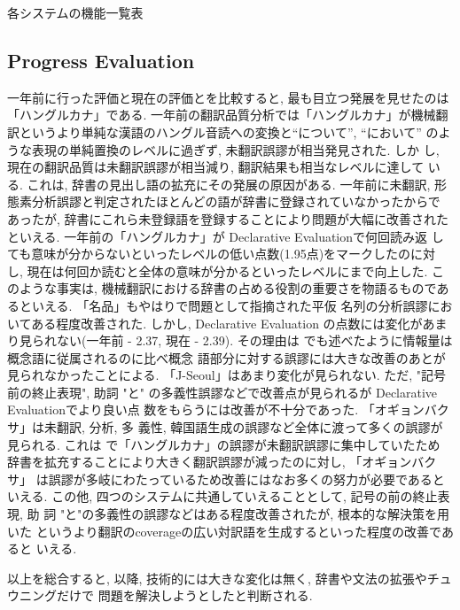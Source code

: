 \begin{table}
\begin{center}
\caption{\label{function}各システムの機能一覧表}
\end{center}
\end{table}

\subsection{Progress Evaluation}
一年前に行った評価と現在の評価とを比較すると, 最も目立つ発展を見せたのは
「ハングルカナ」である. 一年前の翻訳品質分析では「ハングルカナ」が機械翻
訳というより単純な漢語のハングル音読への変換と“について”, “において”
のような表現の単純置換のレベルに過ぎず, 未翻訳誤謬が相当発見された. しか
し, 現在の翻訳品質は未翻訳誤謬が相当減り, 翻訳結果も相当なレベルに達して
いる. これは, 辞書の見出し語の拡充にその発展の原因がある. 一年前に未翻訳, 
形態素分析誤謬と判定されたほとんどの語が辞書に登録されていなかったからで
あったが, 辞書にこれら未登録語を登録することにより問題が大幅に改善された
といえる. 一年前の「ハングルカナ」が Declarative Evaluationで何回読み返
しても意味が分からないといったレベルの低い点数(1.95点)をマークしたのに対
し, 現在は何回か読むと全体の意味が分かるといったレベルにまで向上した. こ
のような事実は, 機械翻訳における辞書の占める役割の重要さを物語るものであ
るといえる.  「名品」もやはり\cite{choiandkim}で問題として指摘された平仮
名列の分析誤謬においてある程度改善された. しかし, Declarative Evaluation
の点数には変化があまり見られない(一年前 - 2.37, 現在 - 2.39). その理由は
\cite{choiandkim}でも述べたように情報量は概念語に従属されるのに比べ概念
語部分に対する誤謬には大きな改善のあとが見られなかったことによる. 
「J-Seoul」はあまり変化が見られない. ただ, "記号前の終止表現", 助詞 "と"
の多義性誤謬などで改善点が見られるが Declarative Evaluationでより良い点
数をもらうには改善が不十分であった. 「オギョンバクサ」は未翻訳, 分析, 多
義性, 韓国語生成の誤謬など全体に渡って多くの誤謬が見られる. これは 
\cite{choiandkim}で「ハングルカナ」の誤謬が未翻訳誤謬に集中していたため
辞書を拡充することにより大きく翻訳誤謬が減ったのに対し, 「オギョンバクサ」
は誤謬が多岐にわたっているため改善にはなお多くの努力が必要であるといえる. 
この他, 四つのシステムに共通していえることとして, 記号の前の終止表現, 助
詞 "と"の多義性の誤謬などはある程度改善されたが, 根本的な解決策を用いた
というより翻訳のcoverageの広い対訳語を生成するといった程度の改善であると
いえる. 

  以上を総合すると,  \cite{choiandkim}以降, 技術的には大きな変化は無く, 辞書や文法の拡張やチュウニングだけで
問題を解決しようとしたと判断される. 



